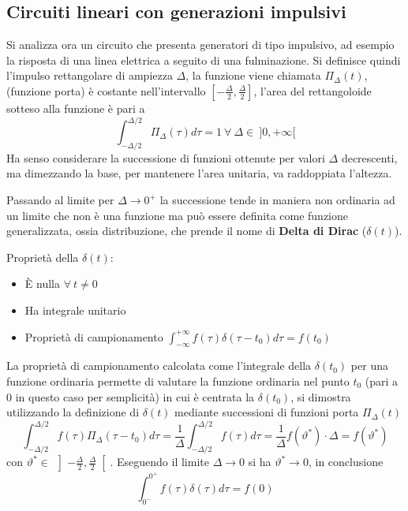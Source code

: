 \subsection{Circuiti lineari con generazioni impulsivi}
Si analizza ora un circuito che presenta generatori di tipo impulsivo, ad esempio la risposta di 
una linea elettrica a seguito di una fulminazione.
Si definisce quindi l'impulso rettangolare di ampiezza $\Delta$, la funzione viene chiamata 
$\Pi_\Delta(t)$, (funzione porta) è costante nell'intervallo $[-\frac{\Delta}{2},\frac{\Delta}{2}]$,
l'area del rettangoloide sotteso alla funzione è pari a
$$
\int_{-\Delta/2}^{\Delta/2}\Pi_\Delta(\tau)d\tau = 1\ \forall\ \Delta \in\ ]0,+\infty[
$$
Ha senso considerare la successione di funzioni ottenute per valori $\Delta$ decrescenti,
ma dimezzando la base, per mantenere l'area unitaria, va raddoppiata l'altezza.

Passando al limite per $\Delta \rightarrow 0^+$ la successione tende in maniera non ordinaria
ad un limite che non è una funzione ma può essere definita come funzione generalizzata,
ossia distribuzione, che prende il nome di \textbf{Delta di Dirac} ($\delta(t)$).

Proprietà della $\delta(t)$:
\begin{itemize}
\item È nulla $\forall\ t \neq 0$
\item Ha integrale unitario
\item Proprietà di campionamento $\int_{-\infty}^{+\infty}f(\tau)\delta(\tau-t_0)d\tau = f(t_0)$
\end{itemize}
\newpage
La proprietà di campionamento calcolata come l'integrale della $\delta(t_0)$ per una funzione ordinaria
permette di valutare la funzione ordinaria nel punto $t_0$ (pari a 0 in questo caso per semplicità)
in cui è centrata la $\delta(t_0)$, si dimostra
utilizzando la definizione di $\delta(t)$ mediante successioni di funzioni porta $\Pi_\Delta(t)$
$$
\int_{-\Delta/2}^{\Delta/2} f(\tau)\Pi_\Delta(\tau-t_0)d\tau = \frac{1}{\Delta} \int_{-\Delta/2}^{\Delta/2}  f(\tau)d\tau = \frac{1}{\Delta}f(\vartheta^*)\cdot\Delta= f(\vartheta^*)
$$
con $\vartheta^* \in\ \left]-\frac{\Delta}{2},\frac{\Delta}{2}\right[$. Eseguendo il limite $\Delta\to 0$ si ha
$\vartheta^* \to 0 $, in conclusione
$$
\int_{0^-}^{0^+} f(\tau)\delta(\tau)d\tau = f(0)
$$

